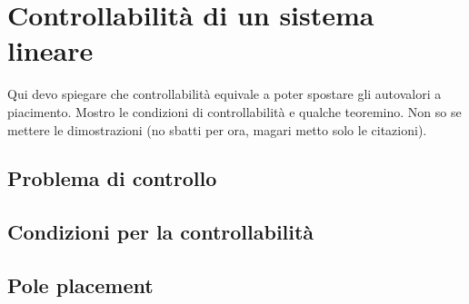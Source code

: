 \section{Controllabilità di un sistema lineare}
Qui devo spiegare che controllabilità equivale a poter spostare gli autovalori a piacimento.
Mostro le condizioni di controllabilità e qualche teoremino. Non so se mettere le
dimostrazioni (no sbatti per ora, magari metto solo le citazioni).

\subsection{Problema di controllo}
\subsection{Condizioni per la controllabilità}
\subsection{Pole placement}